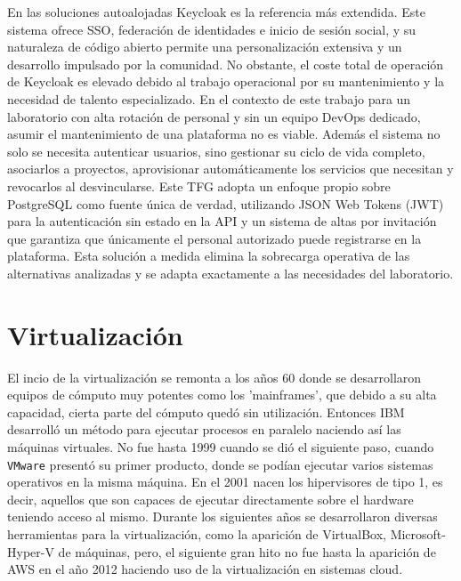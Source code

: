 En las soluciones autoalojadas Keycloak es la referencia más extendida. Este sistema ofrece SSO, federación de identidades e inicio de sesión social,
y su naturaleza de código abierto permite una personalización extensiva y un
desarrollo impulsado por la comunidad.  No obstante,
el coste total de operación de Keycloak es elevado debido
al trabajo operacional por su mantenimiento y la necesidad de talento
especializado. En
el contexto de este trabajo para un laboratorio con alta rotación de personal y sin
un equipo DevOps dedicado, asumir el mantenimiento de una plataforma no es viable. Además el sistema no solo
se necesita autenticar usuarios, sino gestionar su ciclo de vida
completo, asociarlos a proyectos, aprovisionar automáticamente los servicios
que necesitan y revocarlos al desvincularse. Este TFG adopta un enfoque propio
sobre PostgreSQL como fuente única de verdad, utilizando
JSON Web Tokens (JWT) para la autenticación sin estado en la API y
un sistema de altas por invitación que garantiza que únicamente el personal
autorizado puede registrarse en la plataforma. Esta solución a medida elimina
la sobrecarga operativa de las alternativas analizadas y se adapta exactamente
a las necesidades del laboratorio.


\section{Virtualización}

El incio de la virtualización se remonta a los años 60 donde se desarrollaron equipos de cómputo muy potentes como los 'mainframes', que debido a su alta capacidad, cierta parte del cómputo quedó sin utilización. Entonces IBM desarrolló un método para ejecutar procesos en paralelo naciendo así las máquinas virtuales. No fue hasta 1999 cuando se dió el siguiente paso, cuando \texttt{VMware} presentó su primer producto, donde se podían ejecutar varios sistemas operativos en la misma máquina. En el 2001 nacen los hipervisores de tipo 1, es decir, aquellos que son capaces de ejecutar directamente sobre el hardware teniendo acceso al mismo. Durante los siguientes años se desarrollaron diversas herramientas para la virtualización, como la aparición de VirtualBox, Microsoft-Hyper-V de máquinas, pero, el siguiente gran hito no fue hasta la aparición de AWS en el año 2012  haciendo uso de la virtualización en sistemas cloud. \cite{icorp_virtualizacion_ti} 



